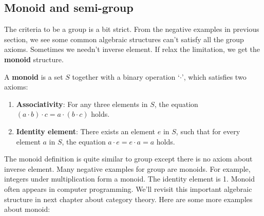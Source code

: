\documentclass[b5paper]{article}
\begin{document}
\begin{Exercise}
\end{Exercise}

\subsection{Monoid and semi-group}

The criteria to be a group is a bit strict. From the negative examples in previous section, we see some common algebraic structures can't satisfy all the group axioms. Sometimes we needn't inverse element. If relax the limitation, we get the \textbf{monoid} structure.

\begin{definition}
A \textbf{monoid} is a set $S$ together with a binary operation `$\cdot$', which satisfies two axioms:
\begin{enumerate}
\item \textbf{Associativity}: For any three elements in $S$, the equation $(a \cdot b) \cdot c = a \cdot (b \cdot c)$ holds.
\item \textbf{Identity element}: There exists an element $e$ in $S$, such that for every element $a$ in $S$, the equation $a \cdot e = e \cdot a = a$ holds.
\end{enumerate}
\end{definition}

The monoid definition is quite similar to group except there is no axiom about inverse element. Many negative examples for group are monoids. For example, integers under multiplication form a monoid. The identity element is 1. Monoid often appears in computer programming. We'll revisit this important algebraic structure in next chapter about category theory. Here are some more examples about monoid:
\end{document}

